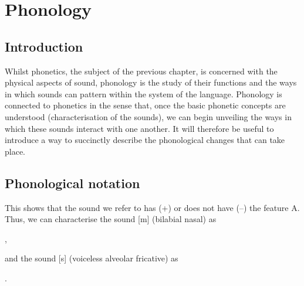 \begin{refsection}
\hypertarget{phonology}{%
\chapter{Phonology}\label{chap-phonology}}

\hypertarget{introduction}{%
\section{Introduction}}

 Whilst phonetics, the subject of the previous chapter, is concerned with the physical aspects of sound, phonology is the study of their functions and the ways in which sounds can pattern within the system of the language. Phonology is connected to phonetics in the sense that, once the basic phonetic concepts are understood (characterisation of the sounds), we can begin unveiling the ways in which these sounds interact with one another. It will therefore be useful to introduce a way to succinctly describe the phonological changes that can take place.

\hypertarget{phonological-notation}{%
\section{Phonological notation}}


\ea  {}
\z

This shows that the sound we refer to has (+) or does not have (--) the
feature A. Thus, we can characterise the sound [m] (bilabial
nasal) as
\begin{center}
,
\end{center}

\noindent and the sound [s] (voiceless alveolar fricative) as
\begin{center}.\end{center}



\end{refsection}
